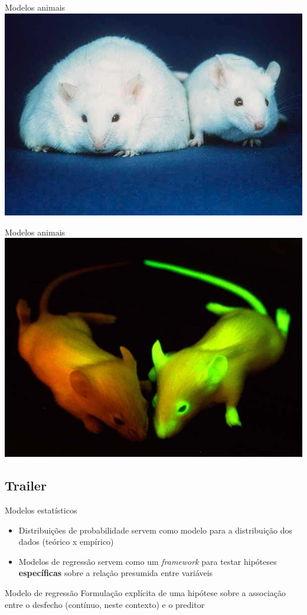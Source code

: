 \documentclass{beamer}
\begin{document}
\begin{frame}{Modelos animais}
  \centering
  \includegraphics[width=\textwidth]{Cap18-19/Fatmouse}
\end{frame}

\begin{frame}{Modelos animais}
  \centering
  \includegraphics[width=\textwidth]{Cap18-19/GFP_hiir}
\end{frame}

\subsection{Trailer}

\begin{frame}{Modelos estatísticos}
  \begin{itemize}
    \footnotesize
  \item Distribuições de probabilidade servem como modelo para a distribuição dos dados (teórico x empírico)
    \bigskip
  \item Modelos de regressão servem como um {\it framework} para testar hipóteses {\bf específicas} sobre a relação presumida entre variáveis
  \end{itemize}
  \vfill
  \begin{block}{Modelo de regressão}
    Formulação explícita de uma hipótese sobre a associação entre o desfecho (contínuo, neste contexto) e o preditor
  \end{block}
\end{frame}
\end{document}
